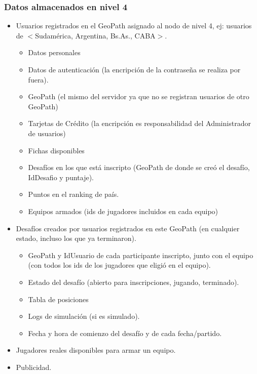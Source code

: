 \subsubsection{Datos almacenados en nivel 4}

\begin{itemize}
	\item Usuarios registrados en el GeoPath asignado al nodo de nivel 4, ej: usuarios de $<$Sudamérica, Argentina, Bs.As., CABA$>$.
	\begin{itemize}
		\item Datos personales
		\item Datos de autenticación (la encripción de la contraseña se realiza por fuera).
		\item GeoPath (el mismo del servidor ya que no se registran usuarios de otro GeoPath)
		\item Tarjetas de Crédito (la encripción es responsabilidad del Administrador de usuarios)
		\item Fichas disponibles
		\item Desafíos en los que está inscripto (GeoPath de donde se creó el desafío, IdDesafio y puntaje).
		\item Puntos en el ranking de país.
		\item Equipos armados (ids de jugadores incluidos en cada equipo)
	\end{itemize}

	\item Desafíos creados por usuarios registrados en este GeoPath (en cualquier estado, incluso los que ya terminaron).
	\begin{itemize}
		\item GeoPath y IdUsuario de cada participante inscripto, junto con el equipo (con todos los ids de los jugadores que eligió en el equipo).
		\item Estado del desafío (abierto para inscripciones, jugando, terminado).
		\item Tabla de posiciones
		\item Logs de simulación (si es simulado).
		\item Fecha y hora de comienzo del desafío y de cada fecha/partido.
	\end{itemize}

	\item Jugadores reales disponibles para armar un equipo.
	
	\item Publicidad.
\end{itemize}


